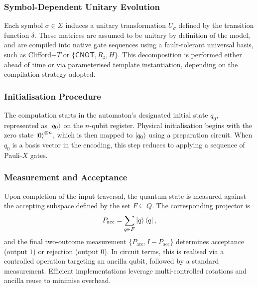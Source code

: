 \subsubsection*{Symbol-Dependent Unitary Evolution}
Each symbol $\sigma \in \Sigma$ induces a unitary transformation $U_\sigma$ defined by the transition function $\delta$. These matrices are assumed to be unitary by definition of the model, and are compiled into native gate sequences using a fault-tolerant universal basis, such as Clifford+$T$ or $\{\textsf{CNOT}, R_z, H\}$. This decomposition is performed either ahead of time or via parameterised template instantiation, depending on the compilation strategy adopted.

\subsubsection*{Initialisation Procedure}
The computation starts in the automaton's designated initial state $q_0$, represented as $\ket{q_0}$ on the $n$-qubit register. Physical initialisation begins with the zero state $\ket{0}^{\otimes n}$, which is then mapped to $\ket{q_0}$ using a preparation circuit. When $q_0$ is a basis vector in the encoding, this step reduces to applying a sequence of Pauli-$X$ gates.

\subsubsection*{Measurement and Acceptance}
Upon completion of the input traversal, the quantum state is measured against the accepting subspace defined by the set $F \subseteq Q$. The corresponding projector is
\[
P_{\text{acc}} = \sum_{q \in F} \ket{q}\bra{q},
\]
and the final two-outcome measurement $\{P_{\text{acc}}, I - P_{\text{acc}}\}$ determines acceptance (output $1$) or rejection (output $0$). In circuit terms, this is realised via a controlled operation targeting an ancilla qubit, followed by a standard measurement. Efficient implementations leverage multi-controlled rotations and ancilla reuse to minimise overhead.


